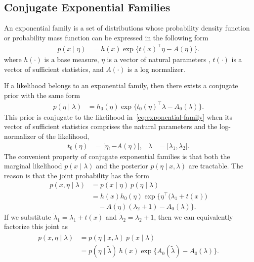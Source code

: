 \documentclass{article}
\begin{document}
\subsection{Conjugate Exponential Families}
An exponential family is a set of distributions whose probability density function or probability mass function can be expressed in the following form
\begin{align}
\label{eq:exponential-family}
    p(x \mid \eta) 
    &= 
    h(x) \exp \big\{ 
        t(x)^\top \eta   
        - A(\eta) \big\}.
\end{align}
where $h(\cdot)$ is a base measure, $\eta$ is a vector of natural parameters , $t(\cdot)$ is a vector of sufficient statistics, and $A(\cdot)$ is a log normalizer.

If a likelihood belongs to an exponential family, then there exists a conjugate prior with the same form
\begin{align}
    p(\eta \mid \lambda) 
    &= 
    h_0(\eta) \exp \big\{ 
    t_0(\eta)^\top \lambda
    - A_0(\lambda) \big\}.
\end{align}   
This prior is conjugate to the likelihood in~\ref{eq:exponential-family} when its vector of sufficient statistics comprises the natural parameters and the log-normalizer of the likelihood,
\begin{align}
    t_0(\eta) &= \big[ \eta, - A(\eta) \big], 
    &
    \lambda &= \big[ \lambda_1, \lambda_2 \big].
\end{align}
The convenient property of conjugate exponential families is that both the marginal likelihood $p(x \mid \lambda)$ and the posterior $p(\eta \mid x, \lambda)$ are tractable. The reason is that the joint probability has the form
\begin{align*}
    p(x, \eta \mid \lambda) &= p(x \mid \eta) \: p(\eta \mid \lambda)\\
    & 
    =h(x)h_0(\eta)\exp \big\{ 
      \eta^\top \! \big(\lambda_1 \!+\! t(x)\big) \\
      &
      \quad - A(\eta) (\lambda_2 \!+\! 1) 
      -
      A_0(\lambda)
    \big\}.
\end{align*}
If we substitute $\tilde{\lambda}_1 = \lambda_1 + t(x)$ and $\tilde{\lambda}_2 = \lambda_2 + 1$, then we can equivalently factorize this joint as
\begin{align}
    \label{eq:cef-joint}
    \begin{split}
    p(x, \eta \mid \lambda) &= p(\eta \mid x, \lambda) \: p(x \mid \lambda) \\
    & = p(\eta \mid \tilde{\lambda}) \: h(x) \exp\big\{ A_0(\tilde{\lambda}) - A_0(\lambda) \big\}.
    \end{split}
\end{align}
\end{document}
